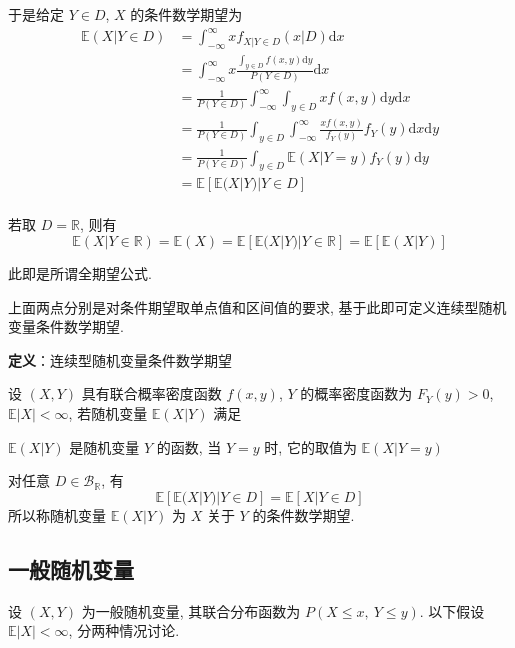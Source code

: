 \documentclass[openany]{ctexbook}
\theoremstyle{kaiti}
\theoremstyle{normal}
\begin{document}
于是给定 $Y\in D$, $X$ 的条件数学期望为
\begin{equation}
  \begin{aligned}
    \mathbb{E}(X|Y\in D)
    &=\int_{-\infty}^\infty xf_{X|Y\in D}(x|D)\mathrm{d}x\\
    &=\int_{-\infty}^\infty x\frac{\displaystyle\int_{y\in D}f(x,y)\mathrm{d}y}{P(Y\in D)}\mathrm{d}x\\
    &=\frac{1}{P(Y\in D)}\int_{-\infty}^\infty\int_{y\in D}xf(x,y)\mathrm{d}y\mathrm{d}x\\
    &=\frac{1}{P(Y\in D)}\int_{y\in D}\int_{-\infty}^\infty\frac{xf(x,y)}{f_Y(y)}f_Y(y)\mathrm{d}x\mathrm{d}y\\
    &=\frac{1}{P(Y\in D)}\int_{y\in D}\mathbb{E}(X|Y=y)f_Y(y)\mathrm{d}y\\
    &=\mathbb{E}[\mathbb{E}(X|Y)|Y\in D]\\
  \end{aligned}
\end{equation}

若取 $D=\mathbb{R}$, 则有
\begin{equation}
  \mathbb{E}(X|Y\in\mathbb{R})=\mathbb{E}(X)=\mathbb{E}[\mathbb{E}(X|Y)|Y\in \mathbb{R}]=\mathbb{E}[\mathbb{E}(X|Y)]
\end{equation}

此即是所谓全期望公式.

上面两点分别是对条件期望取单点值和区间值的要求, 基于此即可定义连续型随机变量条件数学期望.

\textbf{定义}：连续型随机变量条件数学期望

设 $(X,Y)$ 具有联合概率密度函数 $f(x,y)$, $Y$ 的概率密度函数为 $F_Y(y)>0$, $\mathbb{E}|X|<\infty$, 若随机变量 $\mathbb{E}(X|Y)$ 满足

$\mathbb{E}(X|Y)$ 是随机变量 $Y$ 的函数, 当 $Y=y$ 时, 它的取值为 $\mathbb{E}(X|Y=y)$

对任意 $D\in\mathcal{B}_{\mathbb{R}}$, 有
\begin{equation}
  \mathbb{E}[\mathbb{E}(X|Y)|Y\in D]=\mathbb{E}[X|Y\in D]
\end{equation}
所以称随机变量 $\mathbb{E}(X|Y)$ 为 $X$ 关于 $Y$ 的条件数学期望.

\subsection{一般随机变量}

设 $(X,Y)$ 为一般随机变量, 其联合分布函数为 $P(X\leqslant x,~Y\leqslant y)$. 以下假设 $\mathbb{E}|X|<\infty$, 分两种情况讨论.
\end{document}
